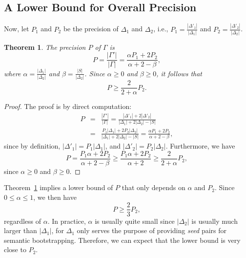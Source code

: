 \documentclass[10pt,journal,cspaper,compsoc]{IEEEtran}
\newtheorem{theorem}{Theorem}
\begin{document}
\subsection{A Lower Bound for Overall Precision}

Now, let $P_1$ and $P_2$ be the precision of $\Delta_1$ and $\Delta_2$, i.e., $P_1=\frac{|\Delta'_1|}{|\Delta_1|}$ and $P_2=\frac{|\Delta'_2|}{|\Delta_2|}$.
\begin{theorem}\label{theorem:prec}
The precision $P$ of $\Gamma$ is
\begin{equation}
P=\frac{|\Gamma'|}{|\Gamma|}=\frac{\alpha P_1+2P_2}{\alpha+2-\beta},
\end{equation}
where $\alpha=\frac{|\Delta_1|}{|\Delta_2|}$ and $\beta=\frac{|S|}{|\Delta_2|}$. Since $\alpha\geq 0$ and $\beta\geq 0$, it follows that
\begin{equation}
P\geq\frac{2}{2+\alpha}P_2.
\end{equation}
\end{theorem}

\begin{proof}
The proof is by direct computation:
\begin{eqnarray}
P&=&\frac{|\Gamma'|}{|\Gamma|}=\frac{|\Delta'_1|+2|\Delta'_2|}{|\Delta_1|+2|\Delta_2|-|S|}\\\nonumber
&=&\frac{P_1|\Delta_1|+2P_2|\Delta_2|}{|\Delta_1|+2|\Delta_2|-|S|}=\frac{\alpha P_1+2P_2}{\alpha+2-\beta},
\end{eqnarray}
since by definition, $|\Delta'_1|=P_1|\Delta_1|$, and $|\Delta'_2|=P_2|\Delta_2|$. Furthermore, we have
\begin{equation}
P=\frac{P_1\alpha+2P_2}{\alpha+2-\beta}\geq\frac{P_1\alpha+2P_2}{\alpha+2}\geq \frac{2}{2+\alpha}P_2,
\end{equation}
since $\alpha\geq 0$ and $\beta\geq 0$.
\end{proof}

Theorem~\ref{theorem:prec} implies a lower bound of $P$ that only depends on $\alpha$ and $P_2$. Since $0\leq\alpha\leq 1$, we then have 
\begin{equation}
P\geq\frac{2}{3}P_2,
\end{equation}
regardless of $\alpha$. In practice, $\alpha$ is usually quite small since $|\Delta_2|$ is usually much larger than $|\Delta_1|$, for $\Delta_1$ only serves the purpose of providing \emph{seed} pairs for semantic bootstrapping. Therefore, we can expect that the lower bound is very close to $P_2$.
\end{document}
